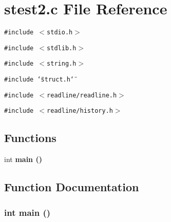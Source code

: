 \section{stest2.c File Reference}
\label{stest2_8c}
{\tt \#include $<$stdio.h$>$}\par
{\tt \#include $<$stdlib.h$>$}\par
{\tt \#include $<$string.h$>$}\par
{\tt \#include \char`\"{}struct.h\char`\"{}}\par
{\tt \#include $<$readline/readline.h$>$}\par
{\tt \#include $<$readline/history.h$>$}\par
\subsection*{Functions}
\begin{CompactItemize}
\item 
int \bf{main} ()
\end{CompactItemize}


\subsection{Function Documentation}
\subsubsection{\setlength{\rightskip}{0pt plus 5cm}int main ()}\label{stest2_8c_e66f6b31b5ad750f1fe042a706a4e3d4}


